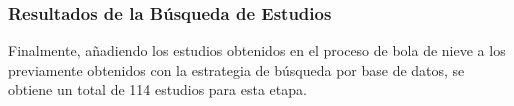 \subsubsection{Resultados de la Búsqueda de Estudios}\label{subsubsec:resultados-busqueda}

Finalmente, añadiendo los \snowballNewStudies{} estudios obtenidos en el proceso de bola de nieve a los \screenTot{} previamente obtenidos con la estrategia de búsqueda por base de datos, se obtiene un total de 114 estudios para esta etapa.
